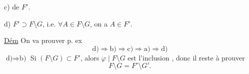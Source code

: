c)   de $F'$.

d) $F'\supset F\setminus G$, i.e. $\forall A\in F\setminus G$, on a $A\in F'$.

\uline{Dém} On va prouver p. ex
\[
 \text{d)}\Longrightarrow\text{b)}\Longrightarrow\text{c)}\Longrightarrow\text{a)}\Longrightarrow\text{d)}
\]
 $\text{d)}\Rightarrow\text{b)}$ Si $(F\setminus G)\subset F'$, alors $\varphi\mid F\setminus G$ est l'inclusion  ,  donc il reste à prouver
\[
 F\setminus G=F'\setminus G'.
\]
